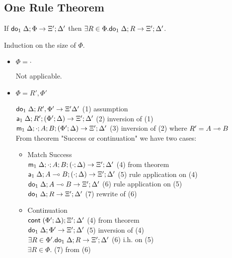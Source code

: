 \subsection{One Rule Theorem}

If $\mathsf{do}_1 \; \Delta; \Phi \rightarrow \Xi'; \Delta'$ then $\exists R \in \Phi. \mathsf{do}_1 \; \Delta; R \rightarrow \Xi'; \Delta'$.

Induction on the size of $\Phi$.

\begin{itemize}
\item $\Phi = \cdot$

Not applicable.

\item $\Phi = R', \Phi'$

$\mathsf{do}_1 \; \Delta; R', \Phi' \rightarrow \Xi' \Delta'$ \hfill (1) assumption \\
$\mathsf{a}_1 \; \Delta; R'; (\Phi'; \Delta) \rightarrow \Xi'; \Delta'$ \hfill (2) inversion of (1) \\
$\mathsf{m}_1 \; \Delta; \cdot; A; B; (\Phi'; \Delta) \rightarrow \Xi'; \Delta'$ \hfill (3) inversion of (2) where $R' = A \multimap B$\\

From theorem "Success or continuation" we have two cases:

   \begin{itemize}
   \item Match Success \\
   $\mathsf{m}_1 \; \Delta; \cdot; A; B; (\cdot; \Delta) \rightarrow \Xi'; \Delta'$ \hfill (4) from theorem \\
   $\mathsf{a}_1 \; \Delta; A \multimap B; (\cdot; \Delta) \rightarrow \Xi'; \Delta'$ \hfill (5) rule application on (4) \\
   $\mathsf{do}_1 \; \Delta; A \multimap B \rightarrow \Xi'; \Delta'$ \hfill (6) rule application on (5) \\
   $\mathsf{do}_1 \; \Delta; R \rightarrow \Xi'; \Delta'$ \hfill (7) rewrite of (6) \\

   \item Continuation \\
   $\mathsf{cont} \; (\Phi'; \Delta); \Xi'; \Delta'$ \hfill (4) from theorem \\
   $\mathsf{do}_1 \; \Delta; \Phi' \rightarrow \Xi'; \Delta'$ \hfill (5) inversion of (4) \\
   $\exists R \in \Phi'. \mathsf{do}_1 \; \Delta; R \rightarrow \Xi'; \Delta'$ \hfill (6) i.h. on (5) \\
   $\exists R \in \Phi.$ \hfill (7) from (6) \\
   \end{itemize}

\end{itemize}